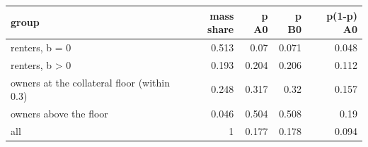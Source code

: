 \begin{tabular}{lrrrr}
\toprule
group & mass share & p A0 & p B0 & p(1-p) A0 \\
\midrule
renters, b = 0 & 0.513 & 0.07 & 0.071 & 0.048 \\
renters, b > 0 & 0.193 & 0.204 & 0.206 & 0.112 \\
owners at the collateral floor (within 0.3) & 0.248 & 0.317 & 0.32 & 0.157 \\
owners above the floor & 0.046 & 0.504 & 0.508 & 0.19 \\
all & 1 & 0.177 & 0.178 & 0.094 \\
\bottomrule
\end{tabular}
